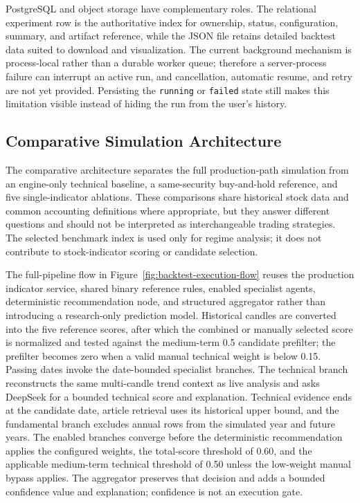 PostgreSQL and object storage have complementary roles. The relational experiment row is the authoritative index for ownership, status, configuration, summary, and artifact reference, while the JSON file retains detailed backtest data suited to download and visualization. The current background mechanism is process-local rather than a durable worker queue; therefore a server-process failure can interrupt an active run, and cancellation, automatic resume, and retry are not yet provided. Persisting the \texttt{running} or \texttt{failed} state still makes this limitation visible instead of hiding the run from the user's history.

\subsection{Comparative Simulation Architecture}
\label{subsec:backtest-evaluation-architecture}

The comparative architecture separates the full production-path simulation from an engine-only technical baseline, a same-security buy-and-hold reference, and five single-indicator ablations. These comparisons share historical stock data and common accounting definitions where appropriate, but they answer different questions and should not be interpreted as interchangeable trading strategies. The selected benchmark index is used only for regime analysis; it does not contribute to stock-indicator scoring or candidate selection.

The full-pipeline flow in Figure~\ref{fig:backtest-execution-flow} reuses the production indicator service, shared binary reference rules, enabled specialist agents, deterministic recommendation node, and structured aggregator rather than introducing a research-only prediction model. Historical candles are converted into the five reference scores, after which the combined or manually selected score is normalized and tested against the medium-term 0.5 candidate prefilter; the prefilter becomes zero when a valid manual technical weight is below 0.15. Passing dates invoke the date-bounded specialist branches. The technical branch reconstructs the same multi-candle trend context as live analysis and asks DeepSeek for a bounded technical score and explanation. Technical evidence ends at the candidate date, article retrieval uses its historical upper bound, and the fundamental branch excludes annual rows from the simulated year and future years. The enabled branches converge before the deterministic recommendation applies the configured weights, the total-score threshold of 0.60, and the applicable medium-term technical threshold of 0.50 unless the low-weight manual bypass applies. The aggregator preserves that decision and adds a bounded confidence value and explanation; confidence is not an execution gate.

